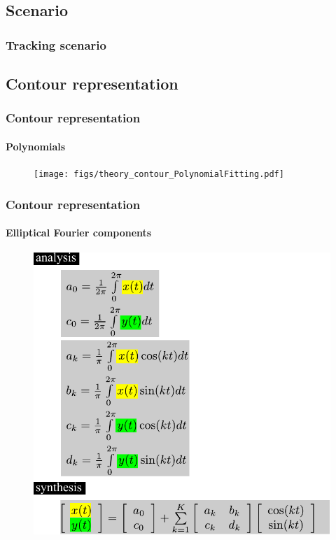 \subsection{Scenario}

\begin{frame}
\frametitle{Tracking scenario}
\logoCSIPCPL\mypagenum	
\end{frame}






\subsection{Contour representation}

\begin{frame}
\frametitle{Contour representation}
\framesubtitle{Polynomials}
\logoCSIPCPL\mypagenum
	\begin{figure}
		\texttt{[image: figs/theory\_contour\_PolynomialFitting.pdf]}
	\end{figure}
\end{frame}


\begin{frame}
\frametitle{Contour representation}
\framesubtitle{Elliptical Fourier components}
\logoCSIPCPL\mypagenum
	\begin{figure}
		\includegraphics[height=0.8\textheight]{figs/theory_curves_ellipticalFourier.pdf}
	\end{figure}
\end{frame}


